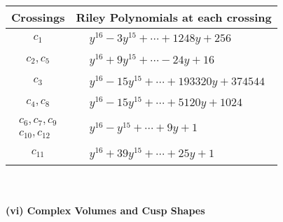 \documentclass[1p]{elsarticle_modified}
\theoremstyle{definition}
\begin{document}
\begin{tabular}{m{50pt}|m{274pt}}
Crossings & \hspace{64pt}Riley Polynomials at each crossing \\
\hline $$\begin{aligned}c_{1}\end{aligned}$$&$\begin{aligned}
&y^{16}-3 y^{15}+\cdots+1248 y+256
\end{aligned}$\\
\hline $$\begin{aligned}c_{2},c_{5}\end{aligned}$$&$\begin{aligned}
&y^{16}+9 y^{15}+\cdots-24 y+16
\end{aligned}$\\
\hline $$\begin{aligned}c_{3}\end{aligned}$$&$\begin{aligned}
&y^{16}-15 y^{15}+\cdots+193320 y+374544
\end{aligned}$\\
\hline $$\begin{aligned}c_{4},c_{8}\end{aligned}$$&$\begin{aligned}
&y^{16}-15 y^{15}+\cdots+5120 y+1024
\end{aligned}$\\
\hline $$\begin{aligned}c_{6},c_{7},c_{9}\\c_{10},c_{12}\end{aligned}$$&$\begin{aligned}
&y^{16}- y^{15}+\cdots+9 y+1
\end{aligned}$\\
\hline $$\begin{aligned}c_{11}\end{aligned}$$&$\begin{aligned}
&y^{16}+39 y^{15}+\cdots+25 y+1
\end{aligned}$\\
\hline
\end{tabular}\\~\\
\newpage\flushleft \textbf{(vi) Complex Volumes and Cusp Shapes}
\end{document}
